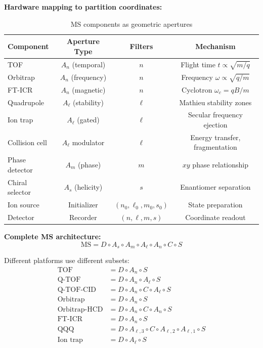 \textbf{Hardware mapping to partition coordinates:}

\begin{table}[h]
\centering
\caption{MS components as geometric apertures}
\label{tab:hardware_apertures}
\begin{tabular}{lccc}
\toprule
\textbf{Component} & \textbf{Aperture Type} & \textbf{Filters} & \textbf{Mechanism} \\
\midrule
TOF & $A_n$ (temporal) & $n$ & Flight time $t \propto \sqrt{m/q}$ \\
Orbitrap & $A_n$ (frequency) & $n$ & Frequency $\omega \propto \sqrt{q/m}$ \\
FT-ICR & $A_n$ (magnetic) & $n$ & Cyclotron $\omega_c = qB/m$ \\
Quadrupole & $A_\ell$ (stability) & $\ell$ & Mathieu stability zones \\
Ion trap & $A_\ell$ (gated) & $\ell$ & Secular frequency ejection \\
Collision cell & $A_\ell$ modulator & $\ell$ & Energy transfer, fragmentation \\
Phase detector & $A_m$ (phase) & $m$ & $xy$ phase relationship \\
Chiral selector & $A_s$ (helicity) & $s$ & Enantiomer separation \\
Ion source & Initializer & $(n_0,\ell_0,m_0,s_0)$ & State preparation \\
Detector & Recorder & $(n,\ell,m,s)$ & Coordinate readout \\
\bottomrule
\end{tabular}
\end{table}

\textbf{Complete MS architecture:}
\begin{equation}
\boxed{\text{MS} = D \circ A_s \circ A_m \circ A_\ell \circ A_n \circ C \circ S}
\end{equation}

Different platforms use different subsets:
\begin{align}
\text{TOF} &= D \circ A_n \circ S \\
\text{Q-TOF} &= D \circ A_n \circ A_\ell \circ S \\
\text{Q-TOF-CID} &= D \circ A_n \circ C \circ A_\ell \circ S \\
\text{Orbitrap} &= D \circ A_n \circ S \\
\text{Orbitrap-HCD} &= D \circ A_n \circ C \circ A_n \circ S \\
\text{FT-ICR} &= D \circ A_n \circ S \\
\text{QQQ} &= D \circ A_{\ell,3} \circ C \circ A_{\ell,2} \circ A_{\ell,1} \circ S \\
\text{Ion trap} &= D \circ A_\ell \circ S
\end{align}

